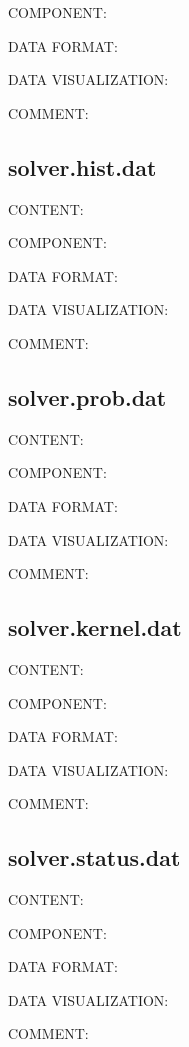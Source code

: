 {\color{green}COMPONENT:}

{\color{blue}DATA FORMAT:}

{\color{brown}DATA VISUALIZATION:}

{\color{purple}COMMENT:}

\subsection{solver.hist.dat}
{\color{red}CONTENT:}

{\color{green}COMPONENT:}

{\color{blue}DATA FORMAT:}

{\color{brown}DATA VISUALIZATION:}

{\color{purple}COMMENT:}

\subsection{solver.prob.dat}
{\color{red}CONTENT:}

{\color{green}COMPONENT:}

{\color{blue}DATA FORMAT:}

{\color{brown}DATA VISUALIZATION:}

{\color{purple}COMMENT:}

\subsection{solver.kernel.dat}
{\color{red}CONTENT:}

{\color{green}COMPONENT:}

{\color{blue}DATA FORMAT:}

{\color{brown}DATA VISUALIZATION:}

{\color{purple}COMMENT:}

\subsection{solver.status.dat}
{\color{red}CONTENT:}

{\color{green}COMPONENT:}

{\color{blue}DATA FORMAT:}

{\color{brown}DATA VISUALIZATION:}

{\color{purple}COMMENT:}
